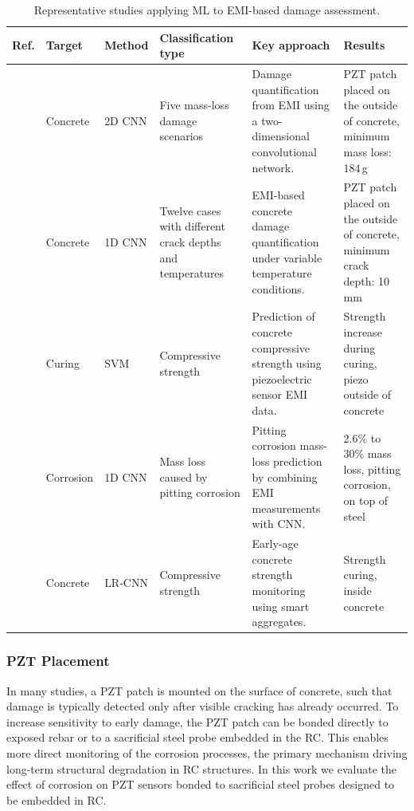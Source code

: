 \documentclass[journal,twoside,web]{ieeecolor}
\begin{document}
\begin{table}[h!]
\centering
\small
\caption{Representative studies applying ML to EMI-based damage assessment.}
\label{tab:emi_concrete_corrosion}
\begin{tabularx}{\textwidth}{lll X X X}
\toprule
Ref. & Target & Method & Classification type & Key approach & Results\\
\midrule
\cite{ai2023} & Concrete & 2D CNN & Five mass-loss damage scenarios & Damage quantification from EMI using a two-dimensional convolutional network. & PZT patch placed on the outside of concrete, minimum mass loss: 184\,g\\
\cite{li2021} & Concrete & 1D CNN & Twelve cases with different crack depths and temperatures & EMI-based concrete damage quantification under variable temperature conditions. & PZT patch placed on the outside of concrete, minimum crack depth: 10\,mm\\
\cite{bansal2022} & Curing & SVM & Compressive strength & Prediction of concrete compressive strength using piezoelectric sensor EMI data. & Strength increase during curing, piezo outside of concrete\\
\cite{luo2022} & Corrosion & 1D CNN & Mass loss caused by pitting corrosion & Pitting corrosion mass-loss prediction by combining EMI measurements with CNN. & 2.6\% to 30\% mass loss, pitting corrosion, on top of steel\\
\cite{li2023} & Concrete & LR-CNN & Compressive strength & Early-age concrete strength monitoring using smart aggregates. & Strength curing, inside concrete\\
\bottomrule
\end{tabularx}
\end{table}

\subsubsection{PZT Placement}

In many studies, a PZT patch is mounted on the surface of concrete, such that damage is typically detected only after visible cracking has already occurred. To increase sensitivity to early damage, the PZT patch can be bonded directly to exposed rebar or to a sacrificial steel probe embedded in the RC. This enables more direct monitoring of the corrosion processes, the primary mechanism driving long-term structural degradation in RC structures. In this work we evaluate the effect of corrosion on PZT sensors bonded to sacrificial steel probes designed to be embedded in RC.
\end{document}
